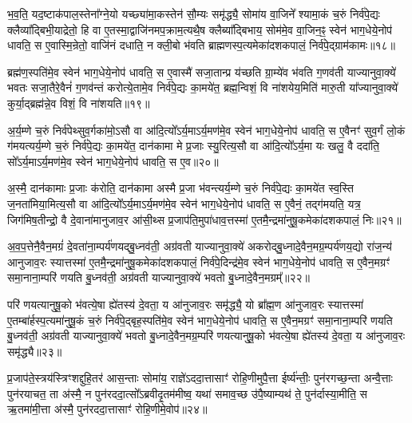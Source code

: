 भ॒व॒ति॒ यद॒ष्टाक॑पाल॒स्तेना᳚ग्ने॒यो यच्छ्या॑मा॒कस्तेन॑ सौ॒म्यः समृ॑द्ध्यै॒ सोमा॑य वा॒जिने᳚ श्यामा॒कं च॒रुं निर्व॑पे॒द्यः क्लैव्या᳚द्बिभी॒याद्रेतो॒ हि वा ए॒तस्मा॒द्वाजि॑नमप॒क्राम॒त्यथै॒ष क्लैब्या᳚द्बिभाय॒ सोम॑मे॒व वा॒जिन॒ꣴ॒ स्वेन॑ भाग॒धेये॒नोप॑ धावति॒ स ए॒वास्मि॒न्रेतो॒ वाजि॑नं दधाति॒ न क्ली॒बो भ॑वति ब्राह्मणस्प॒त्यमेका॑दशकपालं॒ निर्व॑पे॒द्ग्राम॑कामः॥१८॥

ब्रह्म॑ण॒स्पति॑मे॒व स्वेन॑ भाग॒धेये॒नोप॑ धावति॒ स ए॒वास्मै॑ सजा॒तान्प्र य॑च्छति ग्रा॒म्ये॑व भ॑वति ग॒णव॑ती याज्यानुवा॒क्ये॑ भवतः सजा॒तैरे॒वैनं॑ ग॒णव॑न्तं करोत्ये॒तामे॒व निर्व॑पे॒द्यः का॒मये॑त॒ ब्रह्म॒न्विशं॒ वि ना॑शयेय॒मिति॑ मारु॒ती या᳚ज्यानुवा॒क्ये॑ कुर्या॒द्ब्रह्म॑न्ने॒व विशं॒ वि ना॑शयति॥१९॥

{}

अ॒र्य॒म्णे च॒रुं निर्व॑पेथ्सुव॒र्गका॑मो॒\-ऽसौ वा आ॑दि॒त्यो᳚\-ऽर्य॒मा\-ऽर्य॒मण॑मे॒व स्वेन॑ भाग॒धेये॒नोप॑ धावति॒ स ए॒वैनꣳ॑ सुव॒र्गं लो॒कं ग॑मयत्यर्य॒म्णे च॒रुं निर्व॑पे॒द्यः का॒मये॑त॒ दान॑कामा मे प्र॒जाः स्यु॒रित्य॒सौ वा आ॑दि॒त्यो᳚\-ऽर्य॒मा यः खलु॒ वै ददा॑ति॒ सो᳚\-ऽर्य॒मा\-ऽर्य॒मण॑मे॒व स्वेन॑ भाग॒धेये॒नोप॑ धावति॒ स ए॒व॥२०॥

अ॒स्मै॒ दान॑कामाः प्र॒जाः क॑रोति॒ दान॑कामा अस्मै प्र॒जा भ॑वन्त्यर्य॒म्णे च॒रुं निर्व॑पे॒द्यः का॒मये॑त स्व॒स्ति ज॒नता॑मिया॒मित्य॒सौ वा आ॑दि॒त्यो᳚\-ऽर्य॒मा\-ऽर्य॒मण॑मे॒व स्वेन॑ भाग॒धेये॒नोप॑ धावति॒ स ए॒वैनं॒ तद्ग॑मयति॒ यत्र॒ जिग॑मिष॒तीन्द्रो॒ वै दे॒वाना॑मानुजाव॒र आ॑सी॒थ्स प्र॒जाप॑ति॒मुपा॑धाव॒त्तस्मा॑ ए॒तमै॒न्द्रमा॑नुषू॒कमेका॑दशकपालं॒ निः॥२१॥

अ॒व॒प॒त्तेनै॒वैन॒मग्रं॑ दे॒वता॑ना॒म्पर्य॑णयद्बु॒ध्नव॑ती॒ अग्र॑वती याज्यानुवा॒क्ये॑ अकरोद्बु॒ध्नादे॒वैन॒मग्र॒म्पर्य॑णय॒द्यो रा॑ज॒न्य॑ आनुजाव॒रः स्यात्तस्मा॑ ए॒तमै॒न्द्रमा॑नुषू॒कमेका॑दशकपालं॒ निर्व॑पे॒दिन्द्र॑मे॒व स्वेन॑ भाग॒धेये॒नोप॑ धावति॒ स ए॒वैन॒मग्रꣳ॑ समा॒नाना॒म्परि॑ णयति बु॒ध्नव॑ती॒ अग्र॑वती याज्यानुवा॒क्ये॑ भवतो बु॒ध्नादे॒वैन॒मग्रम्᳚॥२२॥

परि॑ णयत्यानुषू॒को भ॑वत्ये॒षा ह्ये॑तस्य॑ दे॒वता॒ य आ॑नुजाव॒रः समृ॑द्ध्यै॒ यो ब्रा᳚ह्म॒ण आ॑नुजाव॒रः स्यात्तस्मा॑ ए॒तम्बा॑र्\mbox{}हस्प॒त्यमा॑नुषू॒कं च॒रुं निर्व॑पे॒द्बृह॒स्पति॑मे॒व स्वेन॑ भाग॒धेये॒नोप॑ धावति॒ स ए॒वैन॒मग्रꣳ॑ समा॒नाना॒म्परि॑ णयति बु॒ध्नव॑ती॒ अग्र॑वती याज्यानुवा॒क्ये॑ भवतो बु॒ध्नादे॒वैन॒मग्र॒म्परि॑ णयत्यानुषू॒को भ॑वत्ये॒षा ह्ये॑तस्य॑ दे॒वता॒ य आ॑नुजाव॒रः समृ॑द्ध्यै॥२३॥

{\anuvakamend[{ए॒व निरग्र॑मे॒तस्य॑ च॒त्वारि॑ च॥४॥}]}

प्र॒जाप॑ते॒स्त्रय॑स्त्रिꣳशद्दुहि॒तर॑ आस॒न्ताः सोमा॑य॒ राज्ञे॑\-ऽददा॒त्तासाꣳ॑ रोहि॒णीमुपै॒त्ता ईर्ष्य॑न्तीः॒ पुन॑रगच्छ॒न्ता अन्वै॒त्ताः पुन॑रयाचत॒ ता अ॑स्मै॒ न पुन॑रददा॒त्सो᳚\-ऽब्रवीदृ॒तम॑मीष्व॒ यथा॑ समाव॒च्छ उ॑पै॒ष्याम्यथ॑ ते॒ पुन॑र्दास्या॒मीति॒ स ऋ॒तमा॑मी॒त्ता अ॑स्मै॒ पुन॑रददा॒त्तासाꣳ॑ रोहि॒णीमे॒वोप॑॥२४॥


